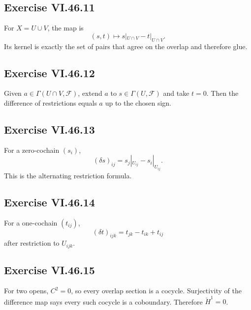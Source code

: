 \subsection*{Exercise VI.46.11}
\begin{solution}
For \(X=U\cup V\), the map is
\[
(s,t)\mapsto s|_{U\cap V}-t|_{U\cap V}.
\]
Its kernel is exactly the set of pairs that agree on the overlap and therefore glue.
\end{solution}

\subsection*{Exercise VI.46.12}
\begin{solution}
Given \(a\in\Gamma(U\cap V,\mathcal F)\), extend \(a\) to \(s\in\Gamma(U,\mathcal F)\) and take \(t=0\).  Then the difference of restrictions equals \(a\) up to the chosen sign.
\end{solution}

\subsection*{Exercise VI.46.13}
\begin{solution}
For a zero-cochain \((s_i)\),
\[
(\delta s)_{ij}=s_j|_{U_{ij}}-s_i|_{U_{ij}}.
\]
This is the alternating restriction formula.
\end{solution}

\subsection*{Exercise VI.46.14}
\begin{solution}
For a one-cochain \((t_{ij})\),
\[
(\delta t)_{ijk}=t_{jk}-t_{ik}+t_{ij}
\]
after restriction to \(U_{ijk}\).
\end{solution}

\subsection*{Exercise VI.46.15}
\begin{solution}
For two opens, \(C^2=0\), so every overlap section is a cocycle.  Surjectivity of the difference map says every such cocycle is a coboundary.  Therefore \(\check H^1=0\).
\end{solution}

